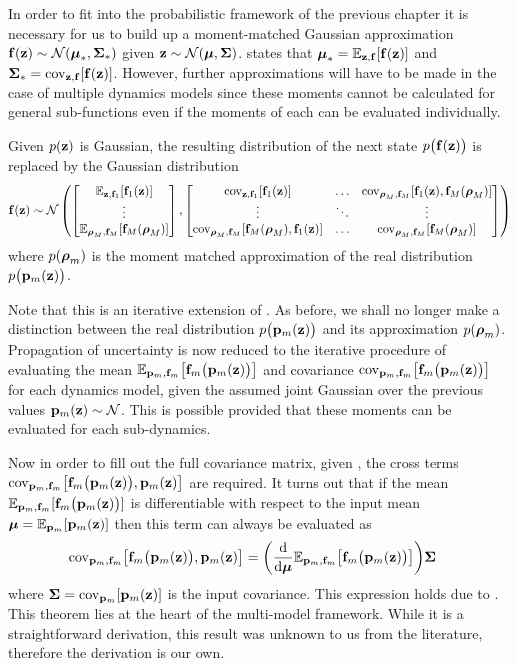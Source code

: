 In order to fit into the probabilistic framework of the previous chapter it is necessary for us to build up a moment-matched Gaussian approximation $\mathbf{f}(\mathbf{z}) \sim \mathcal{N}(\boldsymbol{\mu}_*, \boldsymbol{\Sigma}_*)$ given $\mathbf{z} \sim \mathcal{N}(\boldsymbol{\mu},\boldsymbol{\Sigma})$.  states that $\boldsymbol{\mu}_* = \mathbb{E}_{\mathbf{z},\mathbf{f}}[\mathbf{f}(\mathbf{z})]$ and $\boldsymbol{\Sigma}_* = \mathrm{cov}_{\mathbf{z},\mathbf{f}}[\mathbf{f}(\mathbf{z})]$. However, further approximations will have to be made in the case of multiple dynamics models since these moments cannot be calculated for general sub-functions even if the moments of each can be evaluated individually. 


\begin{ass} \label{ass:multigauss}
Given $p(\mathbf{z})$ is Gaussian, the resulting distribution of the next state $p\big(\mathbf{f}(\mathbf{z})\big)$ is replaced by the Gaussian distribution
\begin{equation*}
\mathbf{f}(\mathbf{z}) \sim \mathcal{N}\left(
\begin{bmatrix} \mathbb{E}_{\mathbf{z},\mathbf{f}_1}[\mathbf{f}_1(\mathbf{z})] \\ \vdots \\ \mathbb{E}_{\boldsymbol{\rho}_M,\mathbf{f}_M}[\mathbf{f}_M(\boldsymbol{\rho}_M)] \end{bmatrix},
\begin{bmatrix} \mathrm{cov}_{\mathbf{z},\mathbf{f}_1}[\mathbf{f}_1(\mathbf{z})] & \dots & \mathrm{cov}_{\boldsymbol{\rho}_M,\mathbf{f}_M}[\mathbf{f}_1(\mathbf{z}),\mathbf{f}_M(\boldsymbol{\rho}_M)] \\
\vdots & \ddots & \vdots \\
\mathrm{cov}_{\boldsymbol{\rho}_M,\mathbf{f}_M}[\mathbf{f}_M(\boldsymbol{\rho}_M),\mathbf{f}_1(\mathbf{z})] & \dots & \mathrm{cov}_{\boldsymbol{\rho}_M,\mathbf{f}_M}[\mathbf{f}_M(\boldsymbol{\rho}_M)] \end{bmatrix}
\right)
\end{equation*}
where $p(\boldsymbol{\rho}_m)$ is the moment matched approximation of the real distribution $p\big(\mathbf{p}_m(\mathbf{z})\big)$.
\end{ass}

Note that this is an iterative extension of . As before, we shall no longer make a distinction between the real distribution $p\big(\mathbf{p}_m(\mathbf{z})\big)$ and its approximation $p(\boldsymbol{\rho}_m)$.
%
Propagation of uncertainty is now reduced to the iterative procedure of evaluating the mean $\mathbb{E}_{\mathbf{p}_m,\mathbf{f}_m}\big[\mathbf{f}_m\big(\mathbf{p}_m(\mathbf{z})\big)\big]$ and covariance $\mathrm{cov}_{\mathbf{p}_m,\mathbf{f}_m}\big[\mathbf{f}_m\big(\mathbf{p}_m(\mathbf{z})\big)\big]$ for each dynamics model, given the assumed joint Gaussian over the previous values $\mathbf{p}_m(\mathbf{z}) \sim \mathcal{N}$. This is possible provided that these moments can be evaluated for each sub-dynamics.

Now in order to fill out the full covariance matrix, given , the cross terms $\mathrm{cov}_{\mathbf{p}_m,\mathbf{f}_m}\big[\mathbf{f}_m\big(\mathbf{p}_m(\mathbf{z})\big), \mathbf{p}_m(\mathbf{z})\big]$ are required. It turns out that if the mean $\mathbb{E}_{\mathbf{p}_m,\mathbf{f}_m}[\mathbf{f}_m\big(\mathbf{p}_m(\mathbf{z})\big)]$ is differentiable with respect to the input mean $\boldsymbol{\mu} = \mathbb{E}_{\mathbf{p}_m}[\mathbf{p}_m(\mathbf{z})]$ then this term can always be evaluated as
%
\begin{align}
\mathrm{cov}_{\mathbf{p}_m,\mathbf{f}_m}\big[\mathbf{f}_m\big(\mathbf{p}_m(\mathbf{z})\big), \mathbf{p}_m(\mathbf{z})\big] &= \bigg(\frac{\mathrm{d} }{\mathrm{d}  \boldsymbol{\mu} } \mathbb{E}_{\mathbf{p}_m,\mathbf{f}_m}\big[\mathbf{f}_m\big(\mathbf{p}_m(\mathbf{z})\big)\big] \bigg) \boldsymbol{\Sigma}
\label{eqn:multicov}
\end{align}
%
where $\boldsymbol{\Sigma} = \mathrm{cov}_{\mathbf{p}_m}[\mathbf{p}_m(\mathbf{z})]$ is the input covariance. This expression holds due to . This theorem lies at the heart of the multi-model framework. While it is a straightforward derivation, this result was unknown to us from the literature, therefore the derivation is our own.



